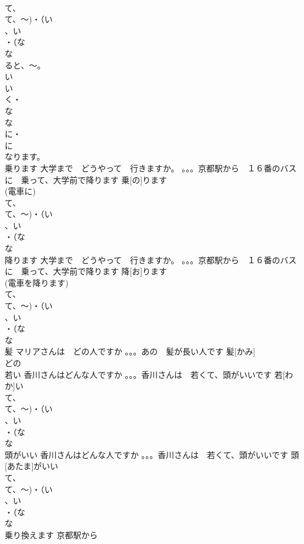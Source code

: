 \documentclass[8pt]{extreport}
\begin{document}
\begin{CJK}{UTF8}{min}
\\	て、
\\	て、～)・（い
\\	、い
\\	・（な
\\	な
\\	ると、～。
\\	い
\\	い
\\	く・
\\	な
\\	な
\\	に・
\\	に　
\\	なります。
\\	乗ります	大学まで　どうやって　行きますか。 。。。京都駅から　１６番のバスに　乗って、大学前で降ります	乗[の]ります			
\\	(電車に)	
\\	て、
\\	て、～)・（い
\\	、い
\\	・（な
\\	な
\\	降ります	大学まで　どうやって　行きますか。 。。。京都駅から　１６番のバスに　乗って、大学前で降ります	降[お]ります			
\\	(電車を降ります)	
\\	て、
\\	て、～)・（い
\\	、い
\\	・（な
\\	な
\\	髪	マリアさんは　どの人ですか 。。。あの　髪が長い人です	髪[かみ]			
\\	どの
\\	若い	香川さんはどんな人ですか 。。。香川さんは　若くて、頭がいいです	若[わか]い			
\\	て、
\\	て、～)・（い
\\	、い
\\	・（な
\\	な
\\	頭がいい	香川さんはどんな人ですか 。。。香川さんは　若くて、頭がいいです	頭[あたま]がいい			
\\	て、
\\	て、～)・（い
\\	、い
\\	・（な
\\	な
\\	乗り換えます	京都駅から　

\end{CJK}
\end{document}
